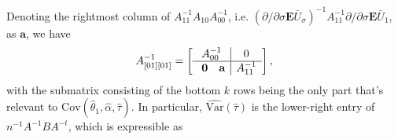 \documentclass[12pt]{article}
\newcommand{\EE}{\mathbf{E}}
\newcommand{\cov}{\mathrm{Cov}}
\begin{document}
Denoting the
rightmost column of $A_{11}^{-1} A_{10}A_{00}^{-1} $, i.e. $(\partial/{\partial \sigma} \EE \bar{U}_{\sigma})^{-1}
A_{11}^{-1} \partial/{\partial \sigma}\EE \bar{U}_{1}$,  as
$\mathbf{a}$, we have 
\begin{equation*}
  A_{[01][01]}^{-1} =\left[
               \begin{array}{cc|c}
                 \multicolumn{2}{c|}{A_{00}^{-1}}& 0 \\ \hline\
                 \mathbf{0} & \mathbf{a} & A_{11}^{-1} \\
               \end{array}
\right] ,
\end{equation*}
with the submatrix consisting of the bottom $k$ rows being the only
part that's relevant to $\cov (\hat{\theta}_{1}, \hat{\alpha},
\hat{\tau})$. 
In particular, $\widehat{\mathrm{Var}} (\hat\tau)$ is
the lower-right entry of $n^{-1} A^{-1} B A^{-t}$, which is
expressible as
\end{document}
